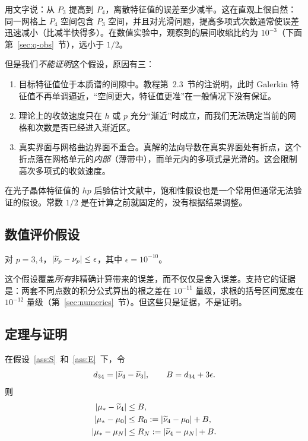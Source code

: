 \documentclass[11pt,a4paper,fontset=fandol]{ctexart}
\begin{document}
用文字说：从 $P_3$ 提高到 $P_4$，离散特征值的误差至少减半。这在直观上很自然：同一网格上 $P_4$ 空间包含 $P_3$ 空间，并且对光滑问题，提高多项式次数通常使误差迅速减小（比减半快得多）。在数值实验中，观察到的层间收缩比约为 $10^{-3}$（下面第~\ref{sec:q-obs}~节），远小于 $1/2$。

但是我们\emph{不能证明}这个假设，原因有三：
\begin{enumerate}
\item 目标特征值位于本质谱的间隙中。教程第~2.3~节的注说明，此时 Galerkin 特征值不再单调逼近，“空间更大，特征值更准”在一般情况下没有保证。
\item 理论上的收敛速度只在 $h$ 或 $p$ 充分“渐近”时成立，而我们无法确定当前的网格和次数是否已经进入渐近区。
\item 真实界面与网格曲边界面不重合。真解的法向导数在真实界面处有折点，这个折点落在网格单元的\emph{内部}（薄带中），而单元内的多项式是光滑的。这会限制高次多项式的收敛速度。
\end{enumerate}
在光子晶体特征值的 $hp$ 后验估计文献中，饱和性假设也是一个常用但通常无法验证的假设\citep{EngstromGianiGrubisic2016}。常数 $1/2$ 是在计算之前就固定的，没有根据结果调整。

\subsection{数值评价假设}

\begin{assumption}[数值评价]
\label{ass:E}
对 $p=3,4$，$|\widetilde\nu_p-\nu_p|\le\epsilon$，其中 $\epsilon=10^{-10}$。
\end{assumption}

这个假设覆盖\emph{所有}非精确计算带来的误差，而不仅仅是舍入误差。支持它的证据是：两套不同点数的积分公式算出的根之差在 $10^{-11}$ 量级，求根的括号区间宽度在 $10^{-12}$ 量级（第~\ref{sec:numerics}~节）。但这些只是证据，不是证明。

\subsection{定理与证明}

\begin{theorem}[条件误差半径]
\label{thm:radius}
在假设~\ref{ass:S}~和~\ref{ass:E}~下，令
\[
d_{34}=|\widetilde\nu_4-\widetilde\nu_3|,\qquad B=d_{34}+3\epsilon .
\]
则
\begin{align}
|\mu_*-\widetilde\nu_4|&\le B, \label{eq:B}\\
|\mu_*-\mu_0|&\le R_0:=|\widetilde\nu_4-\mu_0|+B, \label{eq:R0}\\
|\mu_*-\mu_N|&\le R_N:=|\widetilde\nu_4-\mu_N|+B. \label{eq:RN}
\end{align}
\end{theorem}
\end{document}
